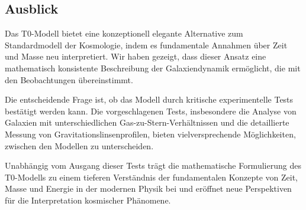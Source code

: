 \documentclass[a4paper,12pt]{article}
\begin{document}
	\subsection{Ausblick}
	
	Das T0-Modell bietet eine konzeptionell elegante Alternative zum Standardmodell der Kosmologie, indem es fundamentale Annahmen über Zeit und Masse neu interpretiert. Wir haben gezeigt, dass dieser Ansatz eine mathematisch konsistente Beschreibung der Galaxiendynamik ermöglicht, die mit den Beobachtungen übereinstimmt.
	
	Die entscheidende Frage ist, ob das Modell durch kritische experimentelle Tests bestätigt werden kann. Die vorgeschlagenen Tests, insbesondere die Analyse von Galaxien mit unterschiedlichen Gas-zu-Stern-Verhältnissen und die detaillierte Messung von Gravitationslinsenprofilen, bieten vielversprechende Möglichkeiten, zwischen den Modellen zu unterscheiden.
	
	Unabhängig vom Ausgang dieser Tests trägt die mathematische Formulierung des T0-Modells zu einem tieferen Verständnis der fundamentalen Konzepte von Zeit, Masse und Energie in der modernen Physik bei und eröffnet neue Perspektiven für die Interpretation kosmischer Phänomene.
	
\end{document}
